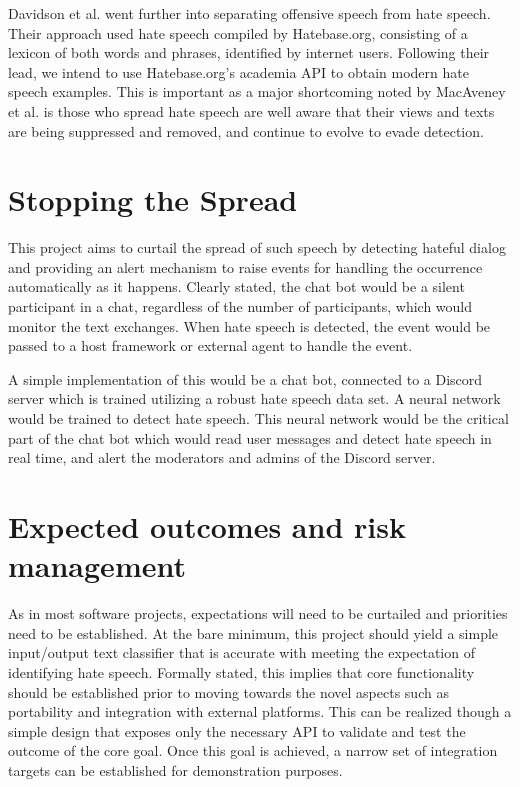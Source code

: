 \documentclass[conference]{sig-alternate-05-2015}
\begin{document}
Davidson et al. went further into separating offensive speech from hate speech.  Their approach used hate speech compiled by Hatebase.org, consisting of a lexicon of both words and phrases, identified by internet users.  Following their lead, we intend to use Hatebase.org's academia API to obtain modern hate speech examples.  This is important as a major shortcoming noted by MacAveney et al.\cite{MacAvaneyetal.} is those who spread hate speech are well aware that their views and texts are being suppressed and removed, and continue to evolve to evade detection.

\section{Stopping the Spread}\label{sec:design}
This project aims to curtail the spread of such speech by detecting hateful dialog and providing an alert mechanism to raise events for handling the occurrence automatically as it happens.  Clearly stated, the chat bot would be a silent participant in a chat, regardless of the number of participants, which would monitor the text exchanges.  When hate speech is detected, the event would be passed to a host framework or external agent to handle the event.

A simple implementation of this would be a chat bot, connected to a Discord server which is trained utilizing a robust hate speech data set. A neural network would be trained to detect hate speech. This neural network would be the critical part of the chat bot which would read user messages and detect hate speech in real time, and alert the moderators and admins of the Discord server.

\section{Expected outcomes and risk management}

As in most software projects, expectations will need to be curtailed and priorities need to be established.  At the bare minimum, this project should yield a simple input/output text classifier that is accurate with meeting the expectation of identifying hate speech.  Formally stated, this implies that core functionality should be established prior to moving towards the novel aspects such as portability and integration with external platforms.  This can be realized though a simple design that exposes only the necessary API to validate and test the outcome of the core goal.  Once this goal is achieved, a narrow set of integration targets can be established for demonstration purposes.
\end{document}
